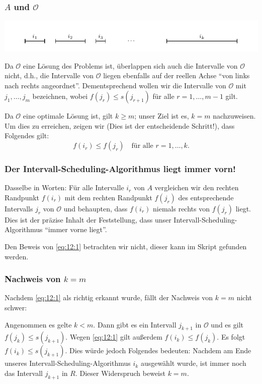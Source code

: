 \documentclass[smaller]{beamer}
\begin{document}
\begin{frame}
\frametitle{$A$ und $\mathcal{O}$}
\begin{center}
\includegraphics{fig73.pdf}
\end{center}

Da $\mathcal{O}$ eine Lösung des Problems ist, überlappen sich auch die Intervalle von $\mathcal{O}$ nicht, d.h., die Intervalle von $\mathcal{O}$ liegen ebenfalls auf der reellen Achse \enquote{von links nach rechts angeordnet}. Dementsprechend wollen wir die Intervalle von $\mathcal{O}$ mit $j_1,\ldots,j_m$ bezeichnen, wobei $f(j_r) \leq s(j_{r+1})$ für alle $r=1,\ldots,m-1$ gilt. \\ \vspace*{0.2cm}

Da $\mathcal{O}$ eine optimale Lösung ist, gilt $k \geq m$; unser Ziel ist es, $k=m$ nachzuweisen. \alert{Um dies zu erreichen, zeigen wir (Dies ist der entscheidende Schritt!), dass Folgendes gilt:
\begin{equation}
\label{eq:12:1}
f(i_r) \leq f(j_r) \quad \text{für alle } r = 1,\ldots,k.
\end{equation}}
\end{frame}

\begin{frame}
 \frametitle{Der Intervall-Scheduling-Algorithmus liegt immer vorn!}
 Dasselbe in Worten: \alert{Für alle Intervalle $i_r$ von $A$ vergleichen wir den rechten Randpunkt $f(i_r)$ mit dem rechten Randpunkt $f(j_r)$ des entsprechende Intervalls $j_r$ von $\mathcal{O}$ und behaupten, dass $f(i_r)$ niemals rechts von $f(j_r)$ liegt}. Dies ist der präzise Inhalt der Feststellung, dass unser Intervall-Scheduling-Algorithmus \enquote{immer vorne liegt}. \\ \vspace*{0.2cm}

 Den Beweis von \eqref{eq:12:1} betrachten wir nicht, dieser kann im Skript gefunden werden. 
\end{frame}

\begin{frame}
 \frametitle{Nachweis von $k=m$}
 Nachdem \eqref{eq:12:1} als richtig erkannt wurde, fällt der Nachweis von $k=m$ nicht schwer: \\ \vspace*{0.2cm}
 
 \alert{Angenommen es gelte $k<m$.} Dann gibt es ein Intervall $j_{k+1}$ in $\mathcal{O}$ und es gilt $f(j_k) \leq s(j_{k+1})$. Wegen \eqref{eq:12:1} gilt außerdem $f(i_k) \leq f(j_k)$. Es folgt $f(i_k) \leq s(j_{k+1})$. Dies würde jedoch Folgendes bedeuten: Nachdem am Ende unseres Intervall-Scheduling-Algorithmus $i_k$ ausgewählt wurde, \alert{ist immer noch das Intervall $j_{k+1}$ in $R$.} Dieser Widerspruch beweist $k=m$.
\end{frame}
\end{document}
